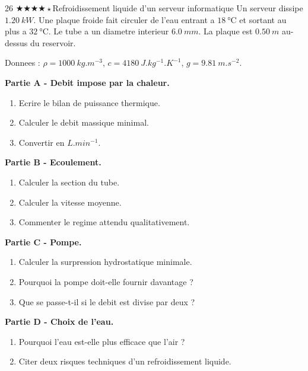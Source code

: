 \documentclass[11pt,a4paper]{article}
\newcommand{\difffour}{\(\bigstar\bigstar\bigstar\bigstar\star\)}
\begin{document}
\begin{probleme}{26 \difffour}{Refroidissement liquide d'un serveur informatique}
Un serveur dissipe \(\SI{1.20}{kW}\). Une plaque froide fait circuler de l'eau entrant a \(\SI{18}{\celsius}\) et sortant au plus a \(\SI{32}{\celsius}\). Le tube a un diametre interieur \(\SI{6.0}{mm}\). La plaque est \(\SI{0.50}{m}\) au-dessus du reservoir.

Donnees : \(\rho=\SI{1000}{kg.m^{-3}}\), \(c=\SI{4180}{J.kg^{-1}.K^{-1}}\), \(g=\SI{9.81}{m.s^{-2}}\).

\textbf{Partie A - Debit impose par la chaleur.}
\begin{enumerate}
\item Ecrire le bilan de puissance thermique.
\item Calculer le debit massique minimal.
\item Convertir en \(\si{L.min^{-1}}\).
\end{enumerate}

\textbf{Partie B - Ecoulement.}
\begin{enumerate}[resume]
\item Calculer la section du tube.
\item Calculer la vitesse moyenne.
\item Commenter le regime attendu qualitativement.
\end{enumerate}

\textbf{Partie C - Pompe.}
\begin{enumerate}[resume]
\item Calculer la surpression hydrostatique minimale.
\item Pourquoi la pompe doit-elle fournir davantage ?
\item Que se passe-t-il si le debit est divise par deux ?
\end{enumerate}

\textbf{Partie D - Choix de l'eau.}
\begin{enumerate}[resume]
\item Pourquoi l'eau est-elle plus efficace que l'air ?
\item Citer deux risques techniques d'un refroidissement liquide.
\end{enumerate}
\end{probleme}
\end{document}
